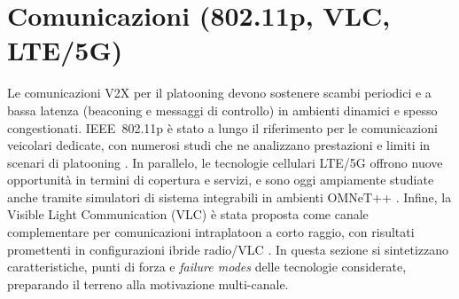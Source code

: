 \section{Comunicazioni (802.11p, VLC, LTE/5G)}
\label{sec:sota_communications}

Le comunicazioni V2X per il platooning devono sostenere scambi periodici e a bassa latenza (beaconing e messaggi di controllo) in ambienti dinamici e spesso congestionati. IEEE~802.11p è stato a lungo il riferimento per le comunicazioni veicolari dedicate, con numerosi studi che ne analizzano prestazioni e limiti in scenari di platooning \cite{ieee80211p-2010,segata2015communication}. In parallelo, le tecnologie cellulari LTE/5G offrono nuove opportunità in termini di copertura e servizi, e sono oggi ampiamente studiate anche tramite simulatori di sistema integrabili in ambienti OMNeT++ \cite{nardini2020simu5g,3gpp-21914-1400}. Infine, la Visible Light Communication (VLC) è stata proposta come canale complementare per comunicazioni intraplatoon a corto raggio, con risultati promettenti in configurazioni ibride radio/VLC \cite{ishihara2015improving,schettler2019deeply}. In questa sezione si sintetizzano caratteristiche, punti di forza e \emph{failure modes} delle tecnologie considerate, preparando il terreno alla motivazione multi-canale.
